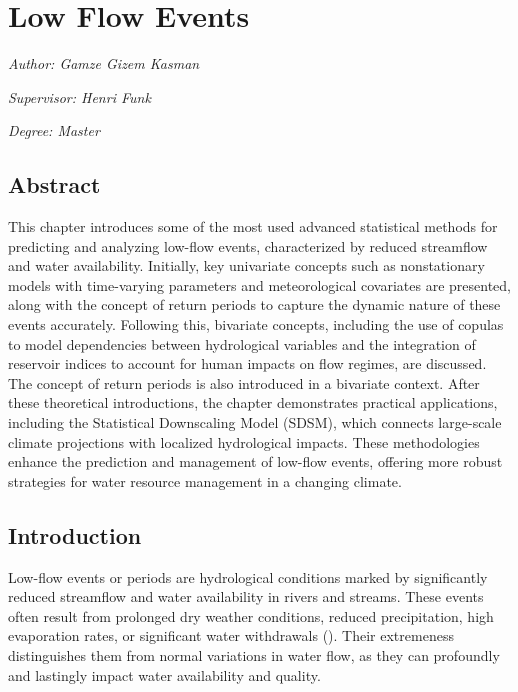 \documentclass[
]{krantz}
\begin{document}
\chapter{Low Flow Events}\label{lfe}

\emph{Author: Gamze Gizem Kasman}

\emph{Supervisor: Henri Funk}

\emph{Degree: Master}

\section{Abstract}\label{abstract-2}

This chapter introduces some of the most used advanced statistical methods for predicting and analyzing low-flow events, characterized by reduced streamflow and water availability. Initially, key univariate concepts such as nonstationary models with time-varying parameters and meteorological covariates are presented, along with the concept of return periods to capture the dynamic nature of these events accurately. Following this, bivariate concepts, including the use of copulas to model dependencies between hydrological variables and the integration of reservoir indices to account for human impacts on flow regimes, are discussed. The concept of return periods is also introduced in a bivariate context. After these theoretical introductions, the chapter demonstrates practical applications, including the Statistical Downscaling Model (SDSM), which connects large-scale climate projections with localized hydrological impacts. These methodologies enhance the prediction and management of low-flow events, offering more robust strategies for water resource management in a changing climate.

\section{Introduction}\label{introduction-3}

Low-flow events or periods are hydrological conditions marked by significantly reduced streamflow and water availability in rivers and streams. These events often result from prolonged dry weather conditions, reduced precipitation, high evaporation rates, or significant water withdrawals (\citet{Smakhtin2001}). Their extremeness distinguishes them from normal variations in water flow, as they can profoundly and lastingly impact water availability and quality.
\end{document}
